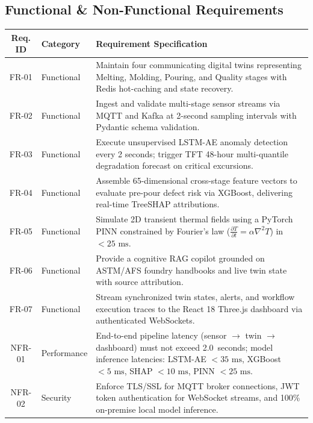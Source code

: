 \documentclass[11pt, a4paper]{article}
\begin{document}
\subsection{Functional \& Non-Functional Requirements}
\begin{table}[H]
    \centering
    \footnotesize
    \renewcommand{\arraystretch}{1.25}
    \begin{tabular}{|c|p{3.0cm}|p{9.2cm}|}
        \hline
        \textbf{Req. ID} & \textbf{Category} & \textbf{Requirement Specification} \\
        \hline
        FR-01 & Functional & Maintain four communicating digital twins representing Melting, Molding, Pouring, and Quality stages with Redis hot-caching and state recovery. \\
        \hline
        FR-02 & Functional & Ingest and validate multi-stage sensor streams via MQTT and Kafka at 2-second sampling intervals with Pydantic schema validation. \\
        \hline
        FR-03 & Functional & Execute unsupervised LSTM-AE anomaly detection every 2 seconds; trigger TFT 48-hour multi-quantile degradation forecast on critical excursions. \\
        \hline
        FR-04 & Functional & Assemble 65-dimensional cross-stage feature vectors to evaluate pre-pour defect risk via XGBoost, delivering real-time TreeSHAP attributions. \\
        \hline
        FR-05 & Functional & Simulate 2D transient thermal fields using a PyTorch PINN constrained by Fourier's law ($\frac{\partial T}{\partial t} = \alpha \nabla^2 T$) in $<25\text{ ms}$. \\
        \hline
        FR-06 & Functional & Provide a cognitive RAG copilot grounded on ASTM/AFS foundry handbooks and live twin state with source attribution. \\
        \hline
        FR-07 & Functional & Stream synchronized twin states, alerts, and workflow execution traces to the React 18 Three.js dashboard via authenticated WebSockets. \\
        \hline
        NFR-01 & Performance & End-to-end pipeline latency (sensor $\rightarrow$ twin $\rightarrow$ dashboard) must not exceed 2.0~seconds; model inference latencies: LSTM-AE $<35\text{ ms}$, XGBoost $<5\text{ ms}$, SHAP $<10\text{ ms}$, PINN $<25\text{ ms}$. \\
        \hline
        NFR-02 & Security & Enforce TLS/SSL for MQTT broker connections, JWT token authentication for WebSocket streams, and 100\% on-premise local model inference. \\

\end{tabular}
\end{table}
\end{document}
